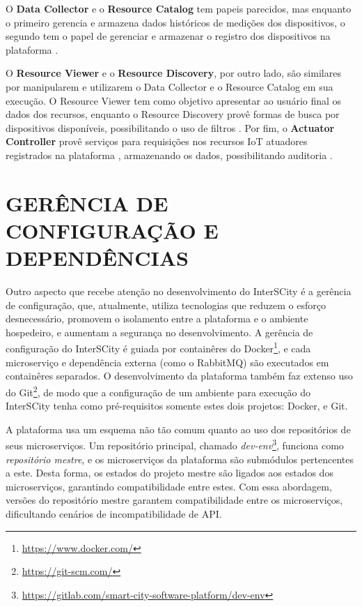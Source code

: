 O \textbf{Data Collector} e o \textbf{Resource Catalog} tem papeis parecidos,
mas enquanto o primeiro gerencia e armazena dados históricos de medições dos
dispositivos, o segundo tem o papel de gerenciar e armazenar o registro dos
dispositivos na plataforma \cite{delesposte2017}.

O \textbf{Resource Viewer} e o \textbf{Resource Discovery}, por outro lado,
são similares por manipularem e utilizarem o Data Collector e o Resource
Catalog em sua execução. O Resource Viewer tem como objetivo apresentar ao
usuário final os dados dos recursos, enquanto o Resource Discovery provê formas
de busca por dispositivos disponíveis, possibilitando o uso de filtros
\cite{delesposte2017}. Por fim, o \textbf{Actuator Controller} provê serviços
para requisições nos recursos IoT atuadores registrados na plataforma
, armazenando os dados, possibilitando auditoria
\cite{delesposte2017}.

\section{GERÊNCIA DE CONFIGURAÇÃO E DEPENDÊNCIAS}

Outro aspecto que recebe atenção no desenvolvimento do InterSCity é a gerência
de configuração, que, atualmente, utiliza tecnologias que reduzem o esforço
desnecessário, promovem o isolamento entre a plataforma e o ambiente hospedeiro,
e aumentam a segurança no desenvolvimento. A gerência de configuração do
InterSCity é guiada por containêres do
Docker\footnote{\url{https://www.docker.com/}}, e cada microserviço e
dependência externa (como o RabbitMQ) são executados em
containêres separados. O desenvolvimento da plataforma também faz extenso
uso do Git\footnote{\url{https://git-scm.com/}}, de modo que a
configuração de um ambiente para execução do InterSCity tenha como
pré-requisitos somente estes dois projetos: Docker, e Git.

A plataforma usa um esquema não tão comum quanto ao uso dos repositórios de
seus microserviços. Um repositório principal, chamado
\textit{dev-env}\footnote{\url{https://gitlab.com/smart-city-software-platform/dev-env}},
funciona como \textit{repositório mestre}, e os microserviços da plataforma são
submódulos pertencentes a este. Desta forma, os estados do projeto mestre são
ligados aos estados dos microserviços, garantindo compatibilidade entre estes.
Com essa abordagem, versões do repositório mestre garantem compatibilidade
entre os microserviços, dificultando cenários de incompatibilidade de API.

